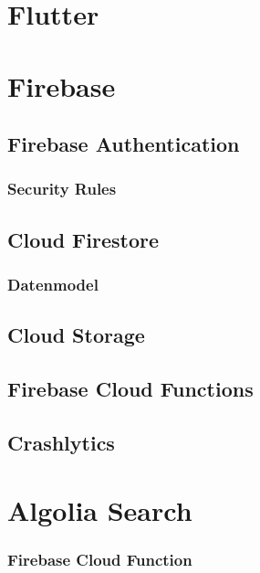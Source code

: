 




\section{Flutter}

\section{Firebase}

\subsection{Firebase Authentication}
\subsubsection{Security Rules}
\subsection{Cloud Firestore}
\subsubsection{Datenmodel}
\subsection{Cloud Storage}
\subsection{Firebase Cloud Functions}

\subsection{Crashlytics}


\section{Algolia Search}
\subsubsection{Firebase Cloud Function}
